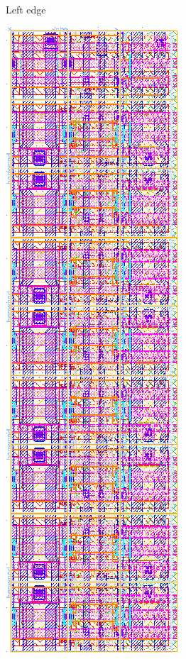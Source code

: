\begin{figure}[H]
\begin{subfigure}[b]{0.22\textwidth}
\caption{Left edge}
\end{subfigure}
\hfill
\begin{subfigure}[b]{0.22\textwidth} \centering
\includegraphics[width=\textwidth]{figures/bitcell_right.png}

\end{subfigure}
\end{figure}
